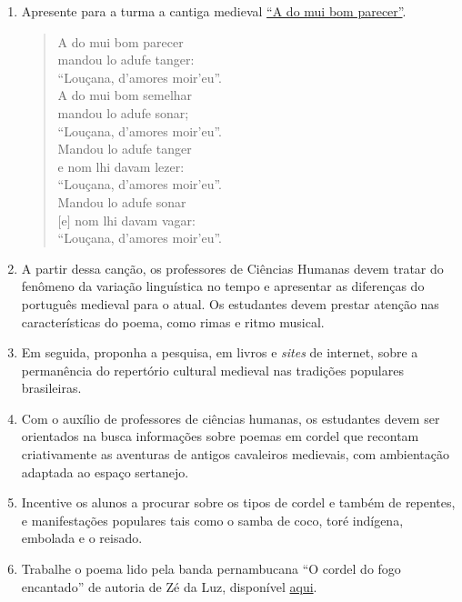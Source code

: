 \documentclass[12pt]{extarticle}
\begin{document}
\begin{enumerate}

\item Apresente para a turma a cantiga medieval
  \href{https://cantigas.fcsh.unl.pt/versaomusical.asp?cdcant=1307&cdvm=247}{``A
do mui bom parecer''}.

\begin{verse} 
A do mui bom parecer\\ 
mandou lo adufe tanger:\\ 
\quad ``Louçana, d'amores moir'eu''.\\ 
A do mui bom semelhar\\ 
mandou lo adufe sonar;\\ 
\quad ``Louçana, d'amores moir'eu''.\\ 
Mandou lo adufe tanger\\ 
e nom lhi davam lezer:\\ 
\quad ``Louçana, d'amores moir'eu''.\\ 
Mandou lo adufe sonar\\ 
$[$e$]$ nom lhi davam vagar:\\ 
\quad ``Louçana, d'amores moir'eu''.  
\end{verse}

\item A partir dessa canção, os professores de Ciências Humanas devem tratar do
  fenômeno da variação linguística no tempo e apresentar as diferenças do
  português medieval para o atual. Os estudantes devem prestar atenção nas
  características do poema, como rimas e ritmo musical.
  
\item Em seguida, proponha a pesquisa, em livros e \emph{sites} de internet,
  sobre a permanência do repertório cultural medieval nas tradições populares
  brasileiras.

\item  Com o auxílio de professores de ciências humanas, os estudantes devem
  ser orientados na busca informações sobre poemas em cordel que recontam
  criativamente as aventuras de antigos cavaleiros medievais, com ambientação
  adaptada ao espaço sertanejo. 

\item Incentive os alunos a procurar sobre os tipos de cordel e também de
  repentes, e manifestações populares tais como o samba de coco, toré indígena,
  embolada e o reisado. 

\item Trabalhe o poema lido pela banda pernambucana ``O cordel do fogo
  encantado'' de autoria de Zé da Luz, disponível
  \href{https://youtu.be/8NBauvFV6bo}{aqui}.


\end{enumerate}
\end{document}

